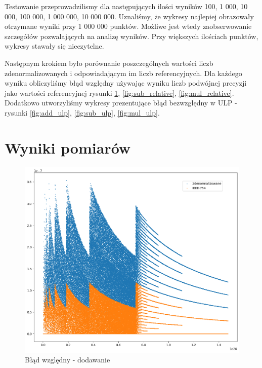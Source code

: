\documentclass{article}
\begin{document}
Testowanie przeprowadzilismy dla następujących ilości wyników 100, 1 000, 10 000, 100 000, 1 000 000, 10 000 000.
Uznaliśmy, że wykresy najlepiej obrazowały otrzymane wyniki przy 1 000 000 punktów.
Możliwe jest wtedy zaobserwowanie szczegółów pozwalających na analizę wyników.
Przy większych ilościach punktów, wykresy stawały się nieczytelne.

Następnym krokiem było porównanie poszczególnych wartości liczb zdenormalizowanych i odpowiadającym im liczb referencyjnych.
Dla każdego wyniku obliczyliśmy błąd względny używając wyniku liczb podwójnej precyzji jako wartości referencyjnej rysunki \ref{fig:add_relative}, \ref{fig:sub_relative}, \ref{fig:mul_relative}.
Dodatkowo utworzyliśmy wykresy prezentujące błąd bezwzględny w ULP - rysunki \ref{fig:add_ulp}, \ref{fig:sub_ulp}, \ref{fig:mul_ulp}.


\section{Wyniki pomiarów}
\begin{figure}[H]
	\centering
	\includegraphics[height=0.4\textheight]{figures/add_relative.png}
	\caption{Błąd względny - dodawanie}
	\label{fig:add_relative}
\end{figure}
\end{document}
